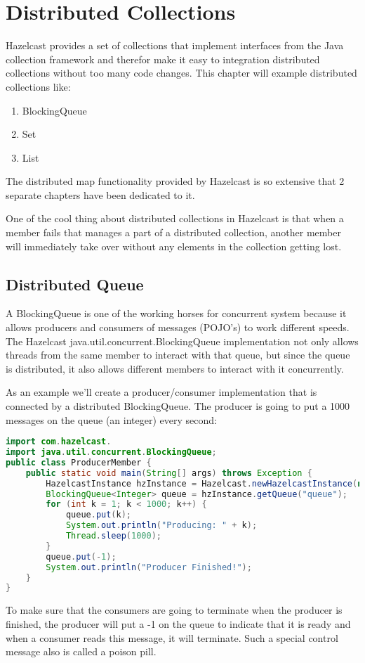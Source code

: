 \chapter{Distributed Collections}
Hazelcast provides a set of collections that implement interfaces from the Java collection framework and therefor make it easy to integration distributed collections without too many code changes. This chapter will example distributed collections like:
\begin{enumerate}
\item BlockingQueue
\item Set
\item List
\end{enumerate}
The distributed map functionality provided by Hazelcast is so extensive that 2 separate chapters have been dedicated to it. 

One of the cool thing about distributed collections in Hazelcast is that when a member fails that manages a part of a distributed collection, another member will immediately take over without any elements in the collection getting lost.

\section{Distributed Queue}
A BlockingQueue is one of the working horses for concurrent system because it allows producers and consumers of messages (POJO's) to work different speeds. The Hazelcast java.util.concurrent.BlockingQueue implementation not only allows threads from the same member to interact with that queue, but since the queue is distributed, it also allows different members to interact with it concurrently.

As an example we'll create a producer/consumer implementation that is connected by a distributed BlockingQueue. The producer is going to put a 1000 messages on the queue (an integer) every second:
\begin{lstlisting}[language=java]
import com.hazelcast.
import java.util.concurrent.BlockingQueue;
public class ProducerMember {
    public static void main(String[] args) throws Exception {
        HazelcastInstance hzInstance = Hazelcast.newHazelcastInstance(null);
        BlockingQueue<Integer> queue = hzInstance.getQueue("queue");
        for (int k = 1; k < 1000; k++) {
            queue.put(k);
            System.out.println("Producing: " + k);
            Thread.sleep(1000);
        }
        queue.put(-1);
        System.out.println("Producer Finished!");
    }
}
\end{lstlisting}
To make sure that the consumers are going to terminate when the producer is finished, the producer will put a -1 on the queue to indicate that it is ready and when a consumer reads this message, it will terminate. Such a special control message also is called a poison pill.

